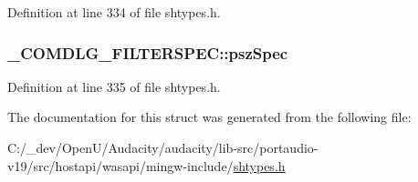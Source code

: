 Definition at line 334 of file shtypes.\+h.

\subsubsection[{\texorpdfstring{psz\+Spec}{pszSpec}}]{ \+\_\+\+C\+O\+M\+D\+L\+G\+\_\+\+F\+I\+L\+T\+E\+R\+S\+P\+E\+C\+::psz\+Spec}\hypertarget{struct___c_o_m_d_l_g___f_i_l_t_e_r_s_p_e_c_a734081de2ba5e0f4ef60cdbd84ff6629}{}\label{struct___c_o_m_d_l_g___f_i_l_t_e_r_s_p_e_c_a734081de2ba5e0f4ef60cdbd84ff6629}


Definition at line 335 of file shtypes.\+h.



The documentation for this struct was generated from the following file\+:\begin{DoxyCompactItemize}
\item 
C\+:/\+\_\+dev/\+Open\+U/\+Audacity/audacity/lib-\/src/portaudio-\/v19/src/hostapi/wasapi/mingw-\/include/\hyperlink{shtypes_8h}{shtypes.\+h}\end{DoxyCompactItemize}
